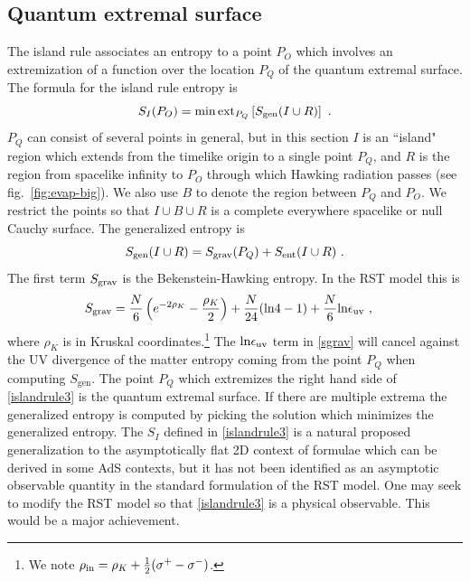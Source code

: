 \documentclass[11pt,oneside,letterpaper]{article}
\newcommand{\be}{\begin{equation}}
\newcommand{\ee}{\end{equation}}
\def\be{\begin{eqnarray}}
\def\ee{\end{eqnarray}}
\def\be{\begin{equation}}
\def\ee{\end{equation}}
\def\euv{\epsilon_{\rm uv}}
\def\log{{\rm ln}}
\numberwithin{equation}{section}
\def \be {\begin{equation}}
\def \ee {\end{equation}}
\begin{document}
\subsection{Quantum extremal surface}\label{ss:qesentropy}
The island rule  associates an entropy to a point $P_O$ which  involves an extremization of a function over the location $P_Q$ of the quantum extremal surface. The formula for the island rule entropy is \cite{Penington:2019npb,Almheiri:2019psf,Almheiri:2019hni} 
\be\label{islandrule3}
S_I(P_O) =   \min \mbox{ext}_{P_Q}\left[ S_{\rm gen}(I \cup R) \right] \ .
\ee
$P_Q$ can consist of several points in general, but in this section $I$ is an ``island" region which extends from the timelike origin to a single point $P_Q$, and $R$ is the region from spacelike infinity to $P_O$ through which Hawking radiation passes (see fig.~\ref{fig:evap-big}). We also use $B$ to denote the region between $P_Q$ and $P_O$. We restrict the points so that  $I\cup B\cup R$ is a complete everywhere spacelike or null Cauchy surface.  
The generalized entropy is 
\be\label{sgen}
S_{\rm gen}(I \cup R) = S_{\rm grav}(P_Q)  + S_{\rm ent }(I \cup R)    \ .
\ee
The first term $S_{\rm grav}$ is the Bekenstein-Hawking entropy. In the RST model this is \cite{Fiola:1994ir}
\begin{align}\label{sgrav}
S_{\rm grav}  &= \frac{N}{6}\left( e^{-2\rho_K} - \frac{\rho_K}{2}\right) + \frac{N}{24}(\log 4 - 1) + \frac{N}{6} \log \euv\ ,
\end{align}
where $\rho_K$ is in Kruskal coordinates.\footnote{We note $ \rho_{\rm in}= \rho_K  + \frac{1}{2}(\sigma^+ - \sigma^-) $.} The $\log \euv $ term in \eqref{sgrav} will cancel against the UV divergence of the matter entropy coming from the point $P_Q$ when computing $S_{\text{gen}}$.  The point $P_Q$ which extremizes the right hand side of \eqref{islandrule3} is the quantum extremal surface.  If there are multiple extrema the generalized entropy is computed by picking the solution which minimizes the generalized entropy. The $S_I$ defined in \eqref{islandrule3} is a natural proposed generalization to the asymptotically flat 2D context of formulae which can be derived in some AdS contexts,  but it has not been identified as an asymptotic observable quantity  in the standard formulation of the RST model. One may seek to modify the RST model so that \eqref{islandrule3} is a physical observable. This would be a major achievement. 
\end{document}
